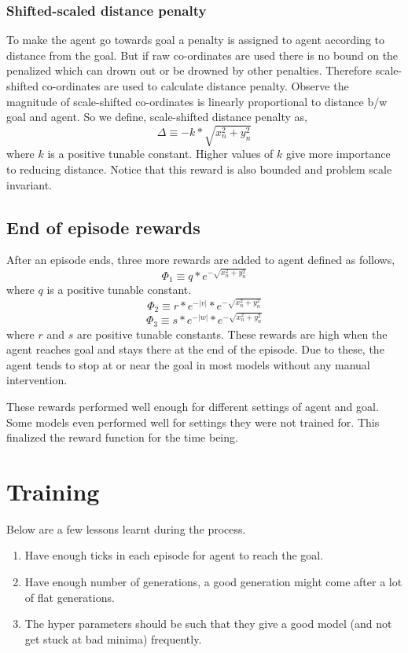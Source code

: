 \documentclass[12pt]{article}
\begin{document}
\subsubsection{Shifted-scaled distance penalty}
To make the agent go towards goal a penalty is assigned to agent according to distance from the goal.
But if raw co-ordinates are used there is no bound on the penalized which can drown out or be drowned by other penalties.
Therefore scale-shifted co-ordinates are used to calculate distance penalty.
Observe the magnitude of scale-shifted co-ordinates is linearly proportional to distance b/w goal and agent.
So we define, scale-shifted distance penalty as,
\[
    \Delta \equiv -k * \sqrt{x_n^2 + y_n^2}
\]
where $k$ is a positive tunable constant.
Higher values of $k$ give more importance to reducing distance.
Notice that this reward is also bounded and problem scale invariant.

\subsection{End of episode rewards}
After an episode ends, three more rewards are added to agent defined as follows,
\[
    \Phi_1 \equiv  q * e^{-\sqrt{x_n^2 + y_n^2}}
\]
where $q$ is a positive tunable constant.
\[
    \Phi_2 \equiv  r * e^{-|v|} * e^{-\sqrt{x_n^2 + y_n^2}}
\]
\[
    \Phi_3 \equiv  s * e^{-|w|} * e^{-\sqrt{x_n^2 + y_n^2}}
\]
where $r$ and $s$ are positive tunable constants.
These rewards are high when the agent reaches goal and stays there at the end of the episode.
Due to these, the agent tends to stop at or near the goal in most models without any manual intervention.

These rewards performed well enough for different settings of agent and goal.
Some models even performed well for settings they were not trained for.
This finalized the reward function for the time being.

\section{Training}
Below are a few lessons learnt during the process.
\begin{enumerate}[nolistsep]
    \item Have enough ticks in each episode for agent to reach the goal.
    \item Have enough number of generations, a good generation might come after a lot of flat generations.
    \item The hyper parameters should be such that they give a good model (and not get stuck at bad minima) frequently.
\end{enumerate}
\end{document}
